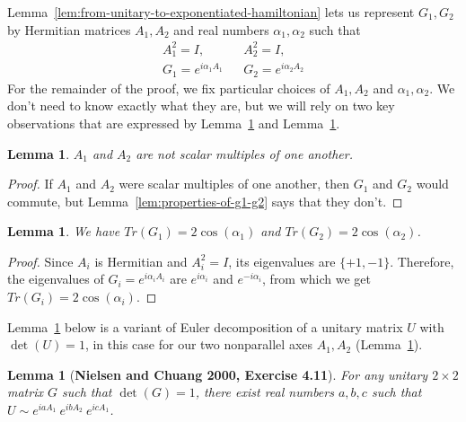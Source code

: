 \documentclass[11pt]{article}
\newtheorem{lemma}[theorem]{Lemma}
\begin{document}
Lemma~\ref{lem:from-unitary-to-exponentiated-hamiltonian} lets us represent
$G_1,G_2$ by Hermitian matrices $A_1,A_2$ and real numbers $\alpha_1,\alpha_2$ 
such that
\begin{eqnarray}
A_1^2=I,
&&
A_2^2=I,
\label{eq:h1-squared-equals-h2-squared-equals-i}
\\
G_1 = e^{i\alpha_1 A_1}
&&
G_2 = e^{i\alpha_2 A_2}
\label{eq:g1-equals-the-exponentiation-of-h1-and-same-for-g2}
\end{eqnarray}
For the remainder of the proof, we fix particular choices of $A_1,A_2$ and 
$\alpha_1,\alpha_2$.
We don't need to know exactly what they are, but we will rely on
two key observations that are expressed by
Lemma~\ref{lem:h1-and-h2-are-not-scalar-multiples-of-one-another} and
Lemma~\ref{lem:trace-of-g1-and-trace-of-g2-expressed-via-alphas}.

\begin{lemma}
\label{lem:h1-and-h2-are-not-scalar-multiples-of-one-another}
$A_1$ and $A_2$ are not scalar multiples of one another.
\end{lemma}

\begin{proof}
If $A_1$ and $A_2$ were scalar multiples of one another,
then $G_1$ and $G_2$ would commute,
but Lemma~\ref{lem:properties-of-g1-g2} says that they don't.
\end{proof}

\begin{lemma}
\label{lem:trace-of-g1-and-trace-of-g2-expressed-via-alphas}
We have 
$Tr(G_1) = 2 \cos(\alpha_1)$ and
$Tr(G_2) = 2 \cos(\alpha_2)$.
\end{lemma}

\begin{proof}
Since $A_i$ is Hermitian and $A_i^2 = I$, its eigenvalues are $\{+1,-1\}$.
Therefore, the eigenvalues of $G_i = e^{i\alpha_i A_i}$ are
$e^{i\alpha_i}$ and $e^{-i\alpha_i}$,
from which we get
$Tr(G_i) = 2 \cos(\alpha_i)$.
\end{proof}

Lemma~\ref{lem:generalized-euler-decomposition} below is 
a variant of Euler decomposition of a unitary matrix $U$
with $\det(U) = 1$, in this case for our two nonparallel axes $A_1,A_2$ 
(Lemma~\ref{lem:h1-and-h2-are-not-scalar-multiples-of-one-another}).

\begin{lemma}[{\bf Nielsen and Chuang 2000, Exercise 4.11}]
\label{lem:generalized-euler-decomposition}
For any unitary $2 \times 2$ matrix $G$ such that $\det(G) = 1$,
there exist real numbers $a,b,c$ such that
$U \sim e^{iaA_1}\ e^{ibA_2}\ e^{icA_1}$.
\end{lemma}
\end{document}
